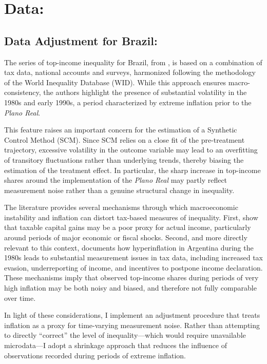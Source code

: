 \documentclass[a4paper, 12pt]{article}
\begin{document}
\section{Data:}
\subsection{Data Adjustment for Brazil:}

The series of top-income inequality for Brazil, from \cite{morgan2025distribution}, is based on a combination of tax data, national accounts and surveys, harmonized following the methodology of the World Inequality Database (WID). 
While this approach ensures macro-consistency, the authors highlight the presence of substantial volatility in the 1980s and early 1990s, a period characterized by extreme inflation prior to the \textit{Plano Real}.

This feature raises an important concern for the estimation of a Synthetic Control Method (SCM). 
Since SCM relies on a close fit of the pre-treatment trajectory, excessive volatility in the outcome variable may lead to an overfitting of transitory fluctuations rather than underlying trends, thereby biasing the estimation of the treatment effect. 
In particular, the sharp increase in top-income shares around the implementation of the \textit{Plano Real} may partly reflect measurement noise rather than a genuine structural change in inequality.

\par
The literature provides several mechanisms through which macroeconomic instability and inflation can distort tax-based measures of inequality. 
First, \cite{burkhauser_measuring_2015} show that taxable capital gains may be a poor proxy for actual income, particularly around periods of major economic or fiscal shocks. 
Second, and more directly relevant to this context, \cite{alvaredo2007richargentina} documents how hyperinflation in Argentina during the 1980s leads to substantial measurement issues in tax data, including increased tax evasion, underreporting of income, and incentives to postpone income declaration. 
These mechanisms imply that observed top-income shares during periods of very high inflation may be both noisy and biased, and therefore not fully comparable over time.

\par
In light of these considerations, I implement an adjustment procedure that treats inflation as a proxy for time-varying measurement noise. 
Rather than attempting to directly “correct” the level of inequality—which would require unavailable microdata—I adopt a shrinkage approach that reduces the influence of observations recorded during periods of extreme inflation.
\end{document}
